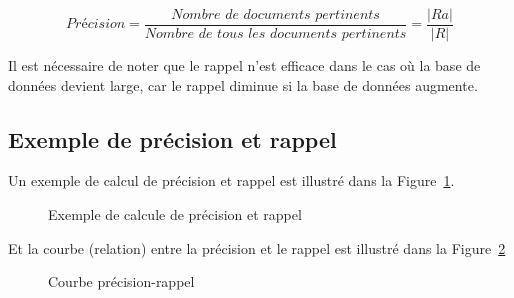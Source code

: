 \[
	Précision = \frac{\textit{Nombre de documents pertinents}}{\textit{Nombre de tous les documents pertinents}} = \frac{|Ra|}{|R|}
\]

Il est nécessaire de noter que le rappel n'est efficace dans le cas où la base de données devient large, car le rappel diminue si la base de données augmente. 

\subsection{Exemple de précision et rappel}
Un exemple de calcul de précision et rappel est illustré dans la Figure~\ref{fig:example-prec-rec}.
\begin{figure}[htbp]
	\begin{center}
	\end{center}
	\caption{Exemple de calcule de précision et rappel \citep{evaluation-sri-cours}}
	\label{fig:example-prec-rec}
\end{figure}

Et la courbe (relation) entre la précision et le rappel est illustré dans la Figure~\ref{fig:example-prec-rec-courbe}
\begin{figure}[htbp]
	\begin{center}
	\end{center}
	\caption{Courbe précision-rappel \citep{evaluation-sri-cours}}
	\label{fig:example-prec-rec-courbe}
\end{figure}

